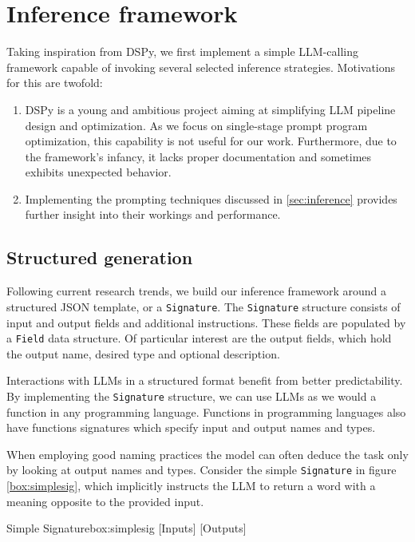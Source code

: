 \section{Inference framework}
Taking inspiration from DSPy\cite{khattab2023dspycompilingdeclarativelanguage}, we first implement a simple LLM-calling framework 
capable of invoking several selected inference strategies. Motivations for this are twofold:
\begin{enumerate}
    \item DSPy is a young and ambitious project aiming at simplifying LLM pipeline design and optimization. 
    As we focus on single-stage prompt program optimization, this capability is not useful for our work. 
    Furthermore, due to the framework's infancy, it lacks proper documentation and sometimes exhibits unexpected behavior.
    \item Implementing the prompting techniques discussed in \ref{sec:inference} provides further insight into their workings and performance.
\end{enumerate}

\subsection{Structured generation}
Following current research trends\cite{zhang2025metapromptingaisystems}, we build our inference framework around a structured JSON template,
or a \texttt{Signature}. The \texttt{Signature} structure consists of input and output fields and additional instructions. 
These fields are populated by a \texttt{Field} data structure.
Of particular interest are the output fields, which hold the output name, desired type and optional description. 

Interactions with LLMs in a structured format benefit from better predictability. By implementing the \texttt{Signature} structure,
we can use LLMs as we would a function in any programming language. Functions in programming languages also have functions signatures which
specify input and output names and types.

When employing good naming practices the model can often deduce the task only by looking at output names and types.
Consider the simple \texttt{Signature} in figure \ref{box:simplesig}, which implicitly instructs the LLM to return a word with a meaning opposite to the provided input.

\begin{figurebox}{Simple Signature}{box:simplesig}
    [Inputs]  
    [Outputs]
\end{figurebox}

